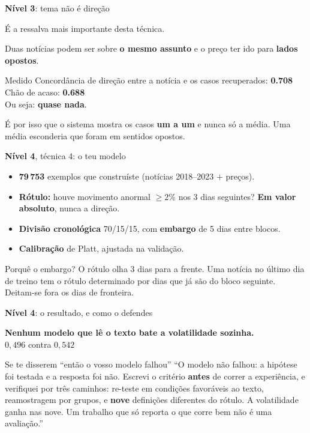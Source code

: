 \documentclass[aspectratio=169]{beamer}
\newcommand{\key}[1]{\textbf{\textcolor{blue!55!black}{#1}}}
\begin{document}
\begin{frame}{\key{Nível 3}: tema não é direção}
\begin{center}
\large É a ressalva mais importante desta técnica.
\end{center}
\vspace{4mm}
Duas notícias podem ser sobre \textbf{o mesmo assunto} e o preço ter ido para \textbf{lados
opostos}.
\vspace{3mm}
\begin{block}{Medido}
Concordância de direção entre a notícia e os casos recuperados: \key{0.708}\\
Chão de acaso: \key{0.688}\\[2mm]
Ou seja: \textbf{quase nada}.
\end{block}
\vspace{2mm}
\footnotesize
É por isso que o sistema mostra os casos \textbf{um a um} e nunca só a média. Uma média
esconderia que foram em sentidos opostos.
\end{frame}

\begin{frame}{\key{Nível 4}, técnica 4: o teu modelo}
\begin{itemize}
  \item \key{79\,753} exemplos que construíste (notícias 2018--2023 $+$ preços).
  \item \key{Rótulo:} houve movimento anormal $\ge 2\%$ nos 3 dias seguintes? \textbf{Em valor
        absoluto}, nunca a direção.
  \item \key{Divisão cronológica} 70/15/15, com \key{embargo} de 5 dias entre blocos.
  \item \key{Calibração} de Platt, ajustada na validação.
\end{itemize}
\vspace{3mm}
\begin{block}{Porquê o embargo?}
O rótulo olha 3 dias para a frente. Uma notícia no último dia de treino tem o rótulo determinado por
dias que já são do bloco seguinte. Deitam-se fora os dias de fronteira.
\end{block}
\end{frame}

\begin{frame}{\key{Nível 4}: o resultado, e como o defendes}
\begin{center}
\textbf{Nenhum modelo que lê o texto bate a volatilidade sozinha.}\\
$0{,}496$ contra $0{,}542$
\end{center}
\vspace{4mm}
\begin{block}{Se te disserem ``então o vosso modelo falhou''}
``O modelo não falhou: a hipótese foi testada e a resposta foi não. Escrevi o critério
\textbf{antes} de correr a experiência, e verifiquei por três caminhos: re-teste em condições
favoráveis ao texto, reamostragem por grupos, e \textbf{nove} definições diferentes do rótulo. A
volatilidade ganha nas nove. Um trabalho que só reporta o que corre bem não é uma avaliação.''
\end{block}
\end{frame}
\end{document}

